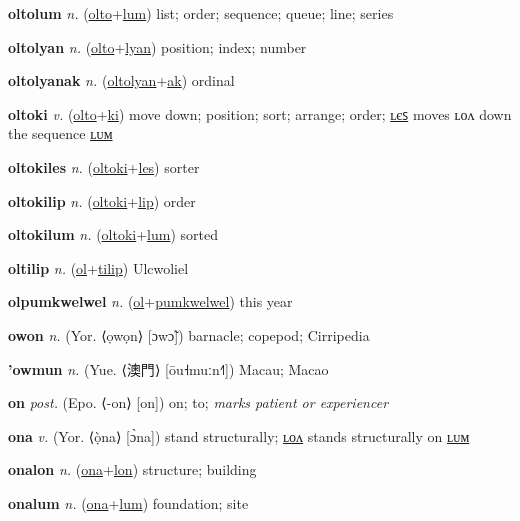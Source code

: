 \textbf{\hypertarget{oltolum}{oltolum}} \textit{n.} (\hyperlink{olto}{olto}+\allowbreak \hyperlink{lum}{lum})
list; order; sequence; queue; line; series

\textbf{\hypertarget{oltolyan}{oltolyan}} \textit{n.} (\hyperlink{olto}{olto}+\allowbreak \hyperlink{lyan}{lyan})
position; index; number

\textbf{\hypertarget{oltolyanak}{oltolyanak}} \textit{n.} (\hyperlink{oltolyan}{oltolyan}+\allowbreak \hyperlink{ak}{ak})
ordinal

\textbf{\hypertarget{oltoki}{oltoki}} \textit{v.} (\hyperlink{olto}{olto}+\allowbreak \hyperlink{ki}{ki})
move down; position; sort; arrange; order; \hyperlink{oltokiles}{ʟєꜱ} moves ʟᴏᴧ down the sequence \hyperlink{oltokilum}{ʟᴜᴍ}

\textbf{\hypertarget{oltokiles}{oltokiles}} \textit{n.} (\hyperlink{oltoki}{oltoki}+\allowbreak \hyperlink{les}{les})
sorter

\textbf{\hypertarget{oltokilip}{oltokilip}} \textit{n.} (\hyperlink{oltoki}{oltoki}+\allowbreak \hyperlink{lip}{lip})
order

\textbf{\hypertarget{oltokilum}{oltokilum}} \textit{n.} (\hyperlink{oltoki}{oltoki}+\allowbreak \hyperlink{lum}{lum})
sorted

\textbf{\hypertarget{oltilip}{oltilip}} \textit{n.} (\hyperlink{ol}{ol}+\allowbreak \hyperlink{tilip}{tilip})
Ulcwoliel

\textbf{\hypertarget{olpumkwelwel}{olpumkwelwel}} \textit{n.} (\hyperlink{ol}{ol}+\allowbreak \hyperlink{pumkwelwel}{pumkwelwel})
this year

\textbf{\hypertarget{owon}{owon}} \textit{n.} (Yor. ⟨ọwọn⟩ [ɔwɔ̃])
barnacle; copepod; Cirripedia

\textbf{\hypertarget{'owmun}{'owmun}} \textit{n.} (Yue. ⟨{\chinese{}澳門}⟩ [ōu˧muːn˧˥])
Macau; Macao

\textbf{\hypertarget{on}{on}} \textit{post.} (Epo. ⟨-on⟩ [on])
on; to; \textit{marks patient or experiencer}

\textbf{\hypertarget{ona}{ona}} \textit{v.} (Yor. ⟨ọ̀na⟩ [ɔ̀na])
stand structurally; \hyperlink{onalon}{ʟᴏᴧ} stands structurally on \hyperlink{onalum}{ʟᴜᴍ}

\textbf{\hypertarget{onalon}{onalon}} \textit{n.} (\hyperlink{ona}{ona}+\allowbreak \hyperlink{lon}{lon})
structure; building

\textbf{\hypertarget{onalum}{onalum}} \textit{n.} (\hyperlink{ona}{ona}+\allowbreak \hyperlink{lum}{lum})
foundation; site

